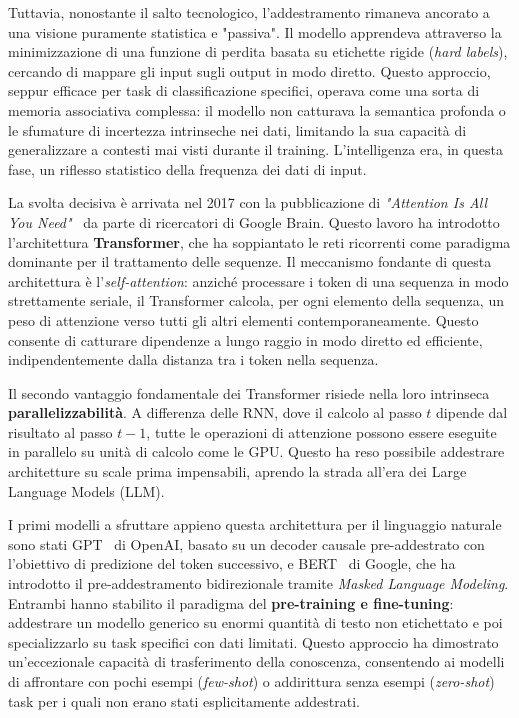 Tuttavia, nonostante il salto tecnologico, l'addestramento rimaneva ancorato a una visione puramente statistica e "passiva". Il modello apprendeva attraverso la minimizzazione di una funzione di perdita basata su etichette rigide (\textit{hard labels}), cercando di mappare gli input sugli output in modo diretto. Questo approccio, seppur efficace per task di classificazione specifici, operava come una sorta di memoria associativa complessa: il modello non catturava la semantica profonda o le sfumature di incertezza intrinseche nei dati, limitando la sua capacità di generalizzare a contesti mai visti durante il training. L'intelligenza era, in questa fase, un riflesso statistico della frequenza dei dati di input.

La svolta decisiva è arrivata nel 2017 con la pubblicazione di \textit{"Attention Is All You Need"}~\cite{vaswani2017attention} da parte di ricercatori di Google Brain. Questo lavoro ha introdotto l'architettura \textbf{Transformer}, che ha soppiantato le reti ricorrenti come paradigma dominante per il trattamento delle sequenze. Il meccanismo fondante di questa architettura è l'\textit{self-attention}: anziché processare i token di una sequenza in modo strettamente seriale, il Transformer calcola, per ogni elemento della sequenza, un peso di attenzione verso tutti gli altri elementi contemporaneamente. Questo consente di catturare dipendenze a lungo raggio in modo diretto ed efficiente, indipendentemente dalla distanza tra i token nella sequenza.

Il secondo vantaggio fondamentale dei Transformer risiede nella loro intrinseca \textbf{parallelizzabilità}. A differenza delle RNN, dove il calcolo al passo $t$ dipende dal risultato al passo $t-1$, tutte le operazioni di attenzione possono essere eseguite in parallelo su unità di calcolo come le GPU. Questo ha reso possibile addestrare architetture su scale prima impensabili, aprendo la strada all'era dei Large Language Models (LLM).

I primi modelli a sfruttare appieno questa architettura per il linguaggio naturale sono stati GPT~\cite{radford2018improving} di OpenAI, basato su un decoder causale pre-addestrato con l'obiettivo di predizione del token successivo, e BERT~\cite{devlin2018bert} di Google, che ha introdotto il pre-addestramento bidirezionale tramite \textit{Masked Language Modeling}. Entrambi hanno stabilito il paradigma del \textbf{pre-training e fine-tuning}: addestrare un modello generico su enormi quantità di testo non etichettato e poi specializzarlo su task specifici con dati limitati. Questo approccio ha dimostrato un'eccezionale capacità di trasferimento della conoscenza, consentendo ai modelli di affrontare con pochi esempi (\textit{few-shot}) o addirittura senza esempi (\textit{zero-shot}) task per i quali non erano stati esplicitamente addestrati.

